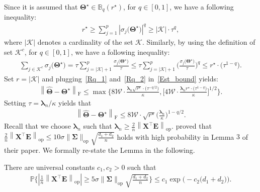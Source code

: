\documentclass[alpha-refs]{wiley-article}
\begin{document}
Since it is assumed that $\boldsymbol{\Theta}^{\star}\in\mathbb{B}_{q}(r^{\star})$, for $q\in[0,1]$, we have a following inequality: 
\begin{align} \label{Rq_1}
    r^{\star} \geq \sum_{j=1}^{p} \left| \sigma_{j}\big(\boldsymbol{\Theta}^{\star} \big) \right|^{q} 
    \geq \left| \mathcal{K} \right| \cdot \tau^{q},
\end{align}
where $\left| \mathcal{K} \right|$ denotes a cardinality of the set $\mathcal{K}$.
Similarly, by using the definition of set $\mathcal{K}^{c}$, for $q\in[0,1]$, we have a following inequality:
\begin{align} \label{Rq_2}
    \sum_{j\in \mathcal{K}^{c}}\sigma_{j}\big(\boldsymbol{\Theta^{\star}}\big)
    = \tau \sum_{j = |\mathcal{K}|+1}^{p} \frac{\sigma_{j}\big(\boldsymbol{\Theta^{\star}}\big)}{\tau}
    \leq \tau \sum_{j = |\mathcal{K}|+1}^{p} \bigg(\frac{\sigma_{j}\big(\boldsymbol{\Theta^{\star}}\big)}{\tau}\bigg)^{q}
    \leq r^{\star} \cdot \big(\tau^{1-q}\big).
\end{align}
Set $r=|\mathcal{K}|$ and plugging~\eqref{Rq_1} and~\eqref{Rq_2} in~\eqref{Est_bound} yields:
\begin{align} \label{Est_bound_1}
    \left\| \widehat{\boldsymbol{\Theta}} - \boldsymbol{\Theta^{\star}} \right\|_{\text{F}}
    \leq \max\bigg\{ 8\mathcal{W} \cdot \frac{\boldsymbol{\lambda}_{n}\sqrt{r^{\star}} \cdot \big(\tau^{-q/2}\big)}{\kappa}, 
    \bigg[  4 \mathcal{W} \cdot \frac{\boldsymbol{\lambda}_{n}r^{\star} \cdot \big(\tau^{1-q}\big)}{\kappa}  \bigg]^{1/2}
    \bigg\}.
\end{align}
Setting $\tau=\boldsymbol{\lambda}_{n}/\kappa$ yields that
\begin{align} \label{Est_bound_2}
    \left\| \widehat{\boldsymbol{\Theta}} - \boldsymbol{\Theta^{\star}} \right\|_{\text{F}}
    \leq 8\mathcal{W} \cdot \sqrt{r^{\star}} \bigg(\frac{\boldsymbol{\lambda}_{n}}{\kappa}\bigg)^{1-q/2}.
\end{align}
Recall that we choose $\boldsymbol{\lambda}_{n}$ such that  $\boldsymbol{\lambda}_{n}\geq\frac{2}{n}\left\|\boldsymbol{X}^{\top}\boldsymbol{E} \right\|_{\text{op}}$.
\citet{negahban2011estimation} proved that $\frac{2}{n}\left\|\boldsymbol{X}^{\top}\boldsymbol{E} \right\|_{\text{op}}\leq 10 \sigma \|\boldsymbol{\Sigma}\|_{\text{op}} \sqrt{\frac{d_{1}+d_{2}}{n}} $ holds with high probability in Lemma $3$ of their paper.
We formally re-state the Lemma in the following.
\begin{lemma}
There are universal constants $c_{1},c_{2}>0$ such that
\begin{align*}
    \mathbb{P}\Bigg\{ \left|\frac{1}{n} \left\| \boldsymbol{X}^{\top}\boldsymbol{E} \right\|_{\text{op}} \right|
    \geq 5 \sigma \|\boldsymbol{\Sigma}\|_{\text{op}} \sqrt{\frac{d_{1}+d_{2}}{n}}  \Bigg\} \leq c_{1} \exp \Big( -c_{2} \big(d_{1}+d_{2}\big) \Big).
\end{align*}
\end{lemma}
\end{document}
